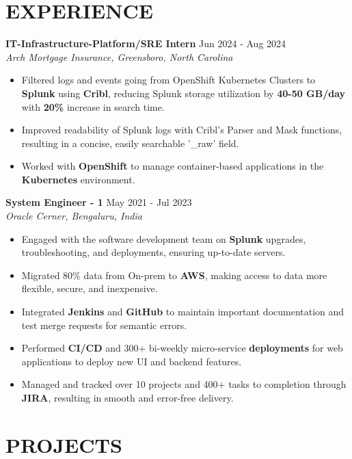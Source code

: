 \documentclass[a4paper,9pt]{extarticle}
\begin{document}
\section*{EXPERIENCE}
\noindent
\textbf{IT-Infrastructure-Platform/SRE Intern}
\hfill Jun 2024 - Aug 2024\\ %
\textit{Arch Mortgage Insurance, Greensboro, North Carolina}
\begin{itemize}
    \item Filtered logs and events going from OpenShift Kubernetes Clusters to \textbf{Splunk} using \textbf{Cribl}, reducing Splunk storage utilization by \textbf{40-50 GB/day} with \textbf{20\%} increase in search time.
    \item Improved readability of Splunk logs with Cribl's Parser and Mask functions, resulting in a concise, easily searchable '\_raw' field.
    \item Worked with \textbf{OpenShift} to manage container-based applications in the \textbf{Kubernetes} environment.
    

\end{itemize}

\noindent
\textbf{System Engineer - 1}
\hfill May 2021 - Jul 2023\\ %
\textit{Oracle Cerner, Bengaluru, India}
\begin{itemize}
    \item Engaged with the software development team on \textbf{Splunk} upgrades, troubleshooting, and deployments, ensuring up-to-date servers.
    \item Migrated 80\% data from On-prem to \textbf{AWS}, making access to data more flexible, secure, and inexpensive.
    \item Integrated \textbf{Jenkins} and \textbf{GitHub} to maintain important documentation and test merge requests for semantic errors.
    \item Performed \textbf{CI/CD} and 300+ bi-weekly micro-service \textbf{deployments} for web applications to deploy new UI and backend features.
    \item Managed and tracked over 10 projects and 400+ tasks to completion through \textbf{JIRA}, resulting in smooth and error-free delivery. 
\end{itemize}



\section*{PROJECTS}
\end{document}
